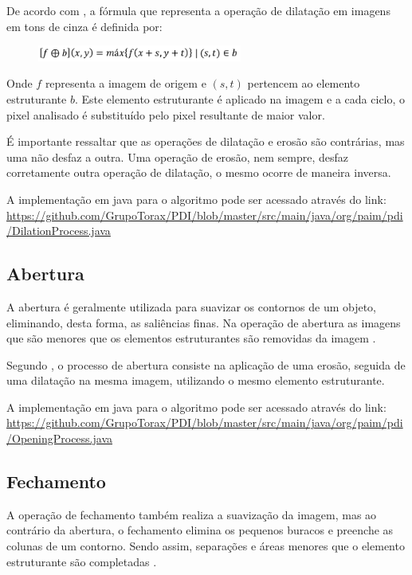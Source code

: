 \documentclass[
	12pt,				%
	oneside,			%
	a4paper,			%
	english,			%
	french,				%
	spanish,			%
	brazil,				%
	]{abntex2}
\begin{document}
De acordo com \citet{pedriniSchwartz:2008}, a fórmula que representa a operação de dilatação em imagens em tons de cinza é definida por:

\begin{figure}[ht]
\centering
\includegraphics[width=0.6\textwidth]{imagens/dilatacao_formula.png}
\end{figure}

Onde \(f\) representa a imagem de origem e \((s, t)\) pertencem ao elemento estruturante \(b\). Este elemento estruturante é aplicado na imagem e a cada ciclo, o pixel analisado é substituído pelo pixel resultante de maior valor.

É importante ressaltar que as operações de dilatação e erosão são contrárias, mas uma não desfaz a outra. Uma operação de erosão, nem sempre, desfaz corretamente outra operação de dilatação, o mesmo ocorre de maneira inversa.

A implementação em java para o algoritmo pode ser acessado através do link:
\url{https://github.com/GrupoTorax/PDI/blob/master/src/main/java/org/paim/pdi/DilationProcess.java}

\subsection{Abertura}

A abertura é geralmente utilizada para suavizar os contornos de um objeto, eliminando, desta forma, as saliências finas. Na operação de abertura as imagens que são menores que os elementos estruturantes são removidas da imagem \cite{gonzalesWoods:2008}.

Segundo \citet{pedriniSchwartz:2008}, o processo de abertura consiste na aplicação de uma erosão, seguida de uma dilatação na mesma imagem, utilizando o mesmo elemento estruturante.

A implementação em java para o algoritmo pode ser acessado através do link:
\url{https://github.com/GrupoTorax/PDI/blob/master/src/main/java/org/paim/pdi/OpeningProcess.java}

\subsection{Fechamento}

A operação de fechamento também realiza a suavização da imagem, mas ao contrário da abertura, o fechamento elimina os pequenos buracos e preenche as colunas de um contorno. Sendo assim, separações e áreas menores que o elemento estruturante são completadas \cite{gonzalesWoods:2008}.
\end{document}
